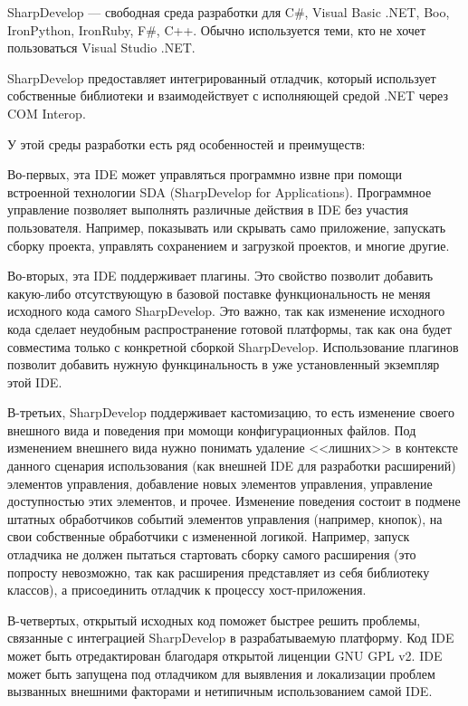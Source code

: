 SharpDevelop — свободная среда разработки для C\#, Visual Basic .NET, Boo, IronPython, IronRuby, F\#, C++. Обычно используется теми, кто не хочет пользоваться Visual Studio .NET.

SharpDevelop предоставляет интегрированный отладчик, который использует собственные библиотеки и взаимодействует с исполняющей средой .NET через COM Interop.

У этой среды разработки есть ряд особенностей и преимуществ:

Во-первых, эта IDE может управляться программно извне при помощи встроенной технологии SDA (SharpDevelop for Applications). Программное управление позволяет выполнять различные действия в IDE без участия пользователя. Например, показывать или скрывать само приложение, запускать сборку проекта, управлять сохранением и загрузкой проектов, и многие другие. 

Во-вторых, эта IDE поддерживает плагины. Это свойство позволит добавить какую-либо отсутствующую в базовой поставке функциональность не меняя исходного кода самого SharpDevelop. Это важно, так как изменение исходного кода сделает неудобным распространение готовой платформы, так как она будет совместима только с конкретной сборкой SharpDevelop. Использование плагинов позволит добавить нужную функцинальность в уже установленный экземпляр этой IDE.

В-третьих, SharpDevelop поддерживает кастомизацию, то есть изменение своего внешного вида и поведения при момощи конфигурационных файлов. Под изменением внешнего вида нужно понимать удаление <<лишних>> в контексте данного сценария использования (как внешней IDE для разработки расширений) элементов управления, добавление новых элементов управления, управление доступностью этих элементов, и прочее. Изменение поведения состоит в подмене штатных обработчиков событий элементов управления (например, кнопок), на свои собственные обработчики с измененной логикой. Например, запуск отладчика не должен пытаться стартовать сборку самого расширения (это попросту невозможно, так как расширения представляет из себя библиотеку классов), а присоединить отладчик к процессу хост-приложения.

В-четвертых, открытый исходных код поможет быстрее решить проблемы, связанные с интеграцией SharpDevelop в разрабатываемую платформу. Код IDE может быть отредактирован благодаря открытой лиценции GNU GPL v2. IDE может быть запущена под отладчиком для выявления и локализации проблем вызванных внешними факторами и нетипичным использованием самой IDE.

